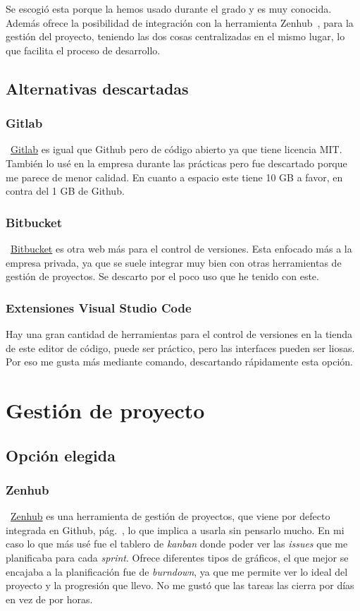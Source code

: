Se escogió esta porque la hemos usado durante el grado y es muy conocida. Además ofrece la posibilidad de integración con la herramienta Zenhub~\pageref{zenhub}, para la gestión del proyecto, teniendo las dos cosas centralizadas en el mismo lugar, lo que facilita el proceso de desarrollo.

\subsection{Alternativas descartadas}

\subsubsection{Gitlab}
~\href{https://gitlab.com/}{Gitlab} es igual que Github pero de código abierto ya que tiene licencia MIT. También lo usé en la empresa durante las prácticas pero fue descartado porque me parece de menor calidad. En cuanto a espacio este tiene 10 GB a favor, en contra del 1 GB de Github.

\subsubsection{Bitbucket}
~\href{https://bitbucket.org/product//}{Bitbucket} es otra web más para el control de versiones. Esta enfocado más a la empresa privada, ya que se suele integrar muy bien con otras herramientas de gestión de proyectos. Se descarto por el poco uso que he tenido con este.

\subsubsection{Extensiones Visual Studio Code}
Hay una gran cantidad de herramientas para el control de versiones en la tienda de este editor de código, puede ser práctico, pero las interfaces pueden ser liosas. Por eso me gusta más mediante comando, descartando rápidamente esta opción.

\section{Gestión de proyecto}

\subsection{Opción elegida}

\subsubsection{Zenhub}\label{zenhub}
~\href{https://bitbucket.org/product//}{Zenhub} es una herramienta de gestión de proyectos, que viene por defecto integrada en Github, pág.~\pageref{github}, lo que implica a usarla sin pensarlo mucho. En mi caso lo que más usé fue el tablero de \emph{kanban} donde poder ver las \emph{issues} que me planificaba para cada \emph{sprint}. Ofrece diferentes tipos de gráficos, el que mejor se encajaba a la planificación fue de \emph{burndown}, ya que me permite ver lo ideal del proyecto y la progresión que llevo. No me gustó que las tareas las cierra por días en vez de por horas.

